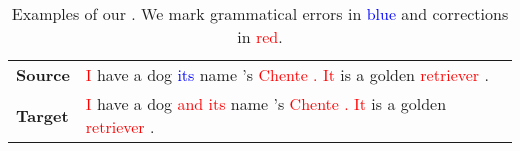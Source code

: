\begin{table*}[tp!]
{\begin{tabular}{ll}
\hdashline

\textbf{\Dataset{} Source}  &
\textcolor{red}{I} have a dog \textcolor{blue}{its} name 's \textcolor{red}{Chente . It} is a golden \textcolor{red}{retriever} .    \\

\textbf{\Dataset{} Target}  &
\textcolor{red}{I} have a dog \textcolor{red}{and its} name 's \textcolor{red}{Chente . It} is a golden \textcolor{red}{retriever} .    \\

\bottomrule
\end{tabular}}

\caption{
Examples of our \Dataset{}. We mark grammatical errors in \textcolor{blue}{blue} and corrections in \textcolor{red}{red}.
}
\label{tab:expect_examples}
\end{table*}